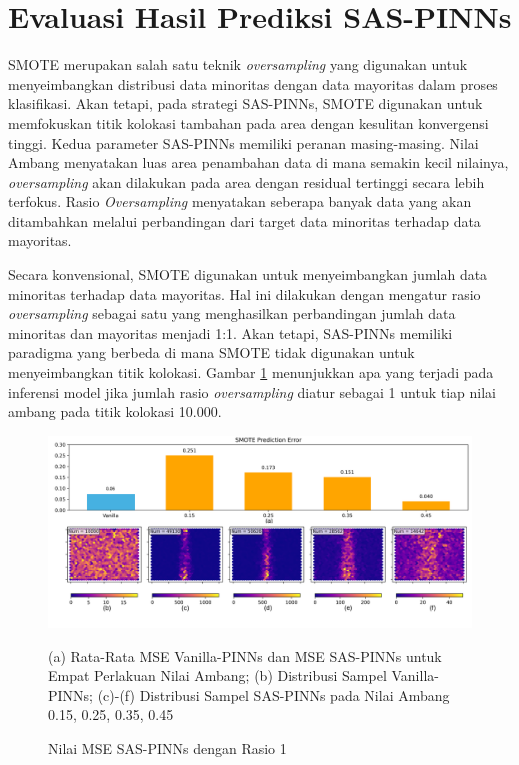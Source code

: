 \section {Evaluasi Hasil Prediksi SAS-PINNs}
SMOTE merupakan salah satu teknik \emph{oversampling} yang digunakan untuk menyeimbangkan distribusi data minoritas dengan data mayoritas dalam proses klasifikasi. Akan tetapi, pada strategi SAS-PINNs, SMOTE digunakan untuk memfokuskan titik kolokasi tambahan pada area dengan kesulitan konvergensi tinggi. Kedua parameter SAS-PINNs memiliki peranan masing-masing. Nilai Ambang menyatakan luas area penambahan data di mana semakin kecil nilainya, \emph{oversampling} akan dilakukan pada area dengan residual tertinggi secara lebih terfokus. Rasio \emph{Oversampling} menyatakan seberapa banyak data yang akan ditambahkan melalui perbandingan dari target data minoritas terhadap data mayoritas.

Secara konvensional, SMOTE digunakan untuk menyeimbangkan jumlah data minoritas terhadap data mayoritas. Hal ini dilakukan dengan mengatur rasio \emph{oversampling} sebagai satu yang menghasilkan perbandingan jumlah data minoritas dan mayoritas menjadi 1:1. Akan tetapi, SAS-PINNs memiliki paradigma yang berbeda di mana SMOTE tidak digunakan untuk menyeimbangkan titik kolokasi. Gambar \ref{fig:Bad-SAS-PINNs} menunjukkan apa yang terjadi pada inferensi model jika jumlah rasio \emph{oversampling} diatur sebagai 1 untuk tiap nilai ambang pada titik kolokasi 10.000.


\begin{figure}[htbp]
    \centering
    \includegraphics[width=0.9 \linewidth]{Gambar/smoteDistribution.png}
    \caption{Nilai MSE SAS-PINNs dengan Rasio 1}
    (a) Rata-Rata MSE Vanilla-PINNs dan MSE SAS-PINNs untuk Empat Perlakuan Nilai Ambang; (b) Distribusi Sampel Vanilla-PINNs; (c)-(f) Distribusi Sampel SAS-PINNs pada Nilai Ambang 0.15, 0.25, 0.35, 0.45
    \label{fig:Bad-SAS-PINNs}
\end{figure}

